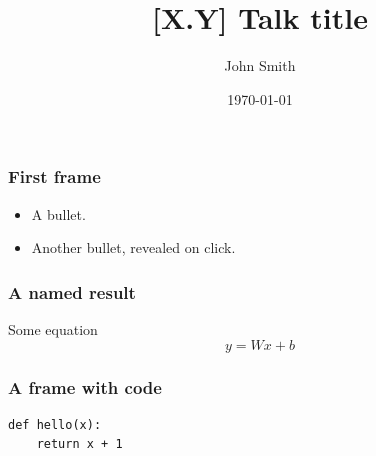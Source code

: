 %
\providecommand{\HANDOUT}{1}




\title[{[X.Y] Talk title}]
{{[X.Y] Talk title}}

\author[John Smith]
{John Smith}


\date[\today]
{\today}

\frame{\titlepage}

\begin{frame}
\frametitle{First frame}
\begin{itemize}
    \item A bullet.
    \pause
    \item Another bullet, revealed on click.
\end{itemize}
\end{frame}

\begin{frame}
\frametitle{A named result}
\begin{block}{Some equation}
    $$ y = Wx + b $$
\end{block}
\end{frame}

\begin{frame}[fragile]
\frametitle{A frame with code}
\begin{block}{}
\begin{lstlisting}
def hello(x):
    return x + 1
\end{lstlisting}
\end{block}
\end{frame}

